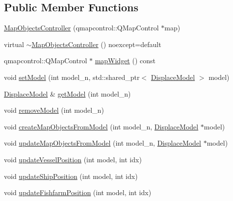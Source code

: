\subsection*{Public Member Functions}
\begin{DoxyCompactItemize}
\item 
\mbox{\hyperlink{class_map_objects_controller_a09ce096ac0198ce211823d615306add8}{Map\+Objects\+Controller}} (qmapcontrol\+::\+Q\+Map\+Control $\ast$map)
\item 
virtual \mbox{\hyperlink{class_map_objects_controller_ae76721a10bd6a8125b3d131cd14868f1}{$\sim$\+Map\+Objects\+Controller}} () noexcept=default
\item 
qmapcontrol\+::\+Q\+Map\+Control $\ast$ \mbox{\hyperlink{class_map_objects_controller_a8fe70fa4680fafeb0a134c62e7bd0abc}{map\+Widget}} () const
\item 
void \mbox{\hyperlink{class_map_objects_controller_a163e83870c660dc1ed9abd3d044ee0ec}{set\+Model}} (int model\+\_\+n, std\+::shared\+\_\+ptr$<$ \mbox{\hyperlink{class_displace_model}{Displace\+Model}} $>$ model)
\item 
\mbox{\hyperlink{class_displace_model}{Displace\+Model}} \& \mbox{\hyperlink{class_map_objects_controller_a4ef22c987718d71c7b44c9760e9e1e26}{get\+Model}} (int model\+\_\+n)
\item 
void \mbox{\hyperlink{class_map_objects_controller_a3f03ccd673981a0fc40b682891873daa}{remove\+Model}} (int model\+\_\+n)
\item 
void \mbox{\hyperlink{class_map_objects_controller_afc842acfedf664454d9255b34100fd3d}{create\+Map\+Objects\+From\+Model}} (int model\+\_\+n, \mbox{\hyperlink{class_displace_model}{Displace\+Model}} $\ast$model)
\item 
void \mbox{\hyperlink{class_map_objects_controller_a9a597f7b8a7c151860bd36ff974a861b}{update\+Map\+Objects\+From\+Model}} (int model\+\_\+n, \mbox{\hyperlink{class_displace_model}{Displace\+Model}} $\ast$model)
\item 
void \mbox{\hyperlink{class_map_objects_controller_a644b1afa1489b2ae7115a8b21e093755}{update\+Vessel\+Position}} (int model, int idx)
\item 
void \mbox{\hyperlink{class_map_objects_controller_ab478e772885e896c850c16531ec49f61}{update\+Ship\+Position}} (int model, int idx)
\item 
void \mbox{\hyperlink{class_map_objects_controller_a9ebf2f570895131ed8f215ac4016ae93}{update\+Fishfarm\+Position}} (int model, int idx)
\item 

\end{DoxyCompactItemize}
